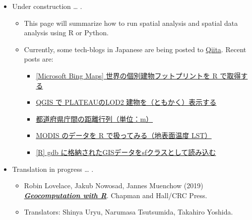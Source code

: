 \documentclass[
]{book}
\providecommand{\tightlist}{%
  \setlength{\itemsep}{0pt}\setlength{\parskip}{0pt}}
\begin{document}
\begin{itemize}
\tightlist
\item
  Under construction \ldots{} .

  \begin{itemize}
  \tightlist
  \item
    This page will summarize how to run spatial analysis and spatial data analysis using R or Python.
  \item
    Currently, some tech-blogs in Japanese are being posted to \href{https://qiita.com/3tky}{Qiita}. Recent posts are:

    \begin{itemize}
    \tightlist
    \item
      \href{https://qiita.com/3tky/items/8eb2aaa81d283edbacfd}{{[}Microsoft Bing Maps{]} 世界の個別建物フットプリントを R で取得する}
    \item
      \href{https://qiita.com/3tky/items/3704c70910d83b8739ca}{QGIS で PLATEAUのLOD2 建物を（ともかく）表示する}
    \item
      \href{https://qiita.com/3tky/items/1be8841454beee03c5c6}{都道府県庁間の距離行列（単位：m）}
    \item
      \href{https://qiita.com/3tky/items/ef0cc4b96332b7175f42}{MODIS のデータを R で扱ってみる（地表面温度 LST）}
    \item
      \href{https://qiita.com/3tky/items/23c6cebd6a20bf118c8c}{{[}R{]} gdb に格納されたGISデータをsfクラスとして読み込む}
    \end{itemize}
  \end{itemize}
\item
  Translation in progress \ldots{} .

  \begin{itemize}
  \tightlist
  \item
    Robin Lovelace, Jakub Nowosad, Jannes Muenchow (2019) \textbf{\emph{\href{https://geocompr.robinlovelace.net/}{Geocomputation with R}}}. Chapman and Hall/CRC Press.
  \item
    Translators: Shinya Uryu, Narumasa Tsutsumida, Takahiro Yoshida.
  \end{itemize}
\end{itemize}

  
\end{document}
